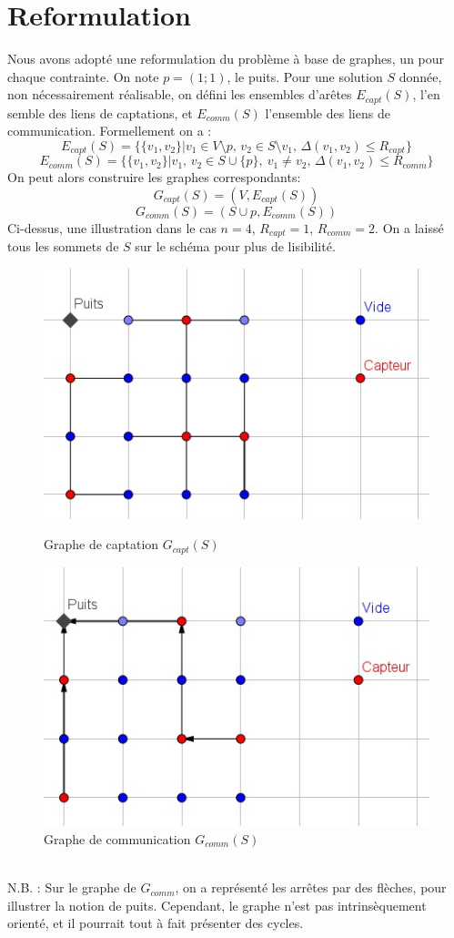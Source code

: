 \documentclass[12pt,a4paper]{article}
\begin{document}
\section{Reformulation}
Nous avons adopté une reformulation du problème à base de graphes, un pour chaque contrainte. On note $p=(1;1)$, le puits. 
Pour une solution $S$ donnée, non nécessairement réalisable, on défini les ensembles d'arêtes $E_{capt}(S)$, l'en semble des liens de captations, et $E_{comm}(S)$ l'ensemble des liens de communication. Formellement on a :
\[E_{capt}(S)=\{\{v_1,v_2\}|v_1\in V\setminus p,\,v_2\in S\setminus v_1,\, \Delta(v_1,v_2)\leq R_{capt}\}\] 
\[E_{comm}(S)=\{\{v_1,v_2\}|v_1,\,v_2\in S\cup \{p\},\ v_1\neq v_2,\,\Delta(v_1,v_2)\leq R_{comm}\}\] 
On peut alors construire les graphes correspondants:
\[G_{capt}(S)=(V,E_{capt}(S))\]
\[G_{comm}(S)=(S\cup p,E_{comm}(S))\]
Ci-dessus, une illustration dans le cas $n=4$, $R_{capt}=1$, $R_{comm}=2$. On a laissé tous les sommets de $S$ sur le schéma pour plus de lisibilité.
\begin{figure}[!h]
\center
\includegraphics[scale=1]{Images/4_1_2_captgraph.jpg}
\caption{Graphe de captation $G_{capt}(S)$}
\includegraphics[scale=1]{Images/4_1_2_commgraph.jpg}
\caption{Graphe de communication $G_{comm}(S)$}
\end{figure}
\\N.B. : Sur le graphe de $G_{comm}$, on a représenté les arrêtes par des flèches, pour illustrer la notion de puits. Cependant, le graphe n'est pas intrinsèquement orienté, et il pourrait tout à fait présenter des cycles.
\end{document}
